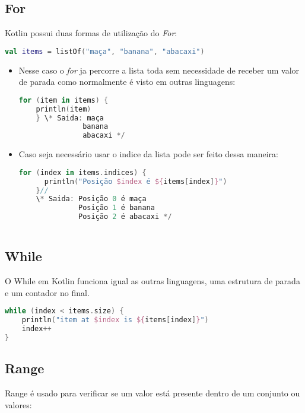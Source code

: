 \subsection{For}
Kotlin possui duas formas de utilização do \emph{For}:
\begin{lstlisting}[label={lst:example1}, language=Kotlin]
  val items = listOf("maça", "banana", "abacaxi")
  \end{lstlisting}
\begin{itemize}
  \item Nesse caso o \emph{for} ja percorre a lista toda sem
        necessidade de receber um valor de parada como normalmente é visto em outras linguagens: 
        \begin{lstlisting}[label={lst:example1}, language=Kotlin]
    for (item in items) {
    println(item)  
    } \* Saida: maça 
               banana 
               abacaxi */
    \end{lstlisting}
        
  \item Caso seja necessário usar o indice da lista pode ser feito dessa maneira:
        \begin{lstlisting}[label={lst:example1}, language=Kotlin]
    for (index in items.indices) {
      println("Posição $index é ${items[index]}")
    }//   
    \* Saida: Posição 0 é maça 
              Posição 1 é banana 
              Posição 2 é abacaxi */  
  
  \end{lstlisting}
\end{itemize}

\subsection{While}
O While em Kotlin funciona igual as outras linguagens, uma estrutura de parada e um contador no final.  
\begin{lstlisting}[label={lst:example1}, language=Kotlin]
  while (index < items.size) {
    println("item at $index is ${items[index]}")
    index++
}
\end{lstlisting}


\subsection{Range}
Range é usado para verificar se um valor está presente dentro de um conjunto ou valores:

